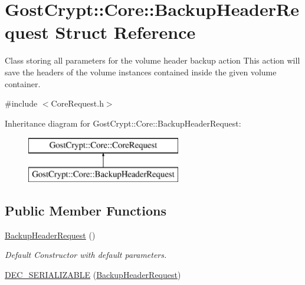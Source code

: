 \hypertarget{struct_gost_crypt_1_1_core_1_1_backup_header_request}{}\section{Gost\+Crypt\+:\+:Core\+:\+:Backup\+Header\+Request Struct Reference}
\label{struct_gost_crypt_1_1_core_1_1_backup_header_request}


Class storing all parameters for the volume header backup action This action will save the headers of the volume instances contained inside the given volume container.  




{\ttfamily \#include $<$Core\+Request.\+h$>$}

Inheritance diagram for Gost\+Crypt\+:\+:Core\+:\+:Backup\+Header\+Request\+:\begin{figure}[H]
\begin{center}
\leavevmode
\includegraphics[height=2.000000cm]{struct_gost_crypt_1_1_core_1_1_backup_header_request}
\end{center}
\end{figure}
\subsection*{Public Member Functions}
\begin{DoxyCompactItemize}
\item 
\hyperlink{struct_gost_crypt_1_1_core_1_1_backup_header_request_a5af656ceab0d38e0a47d46d0e02de1f7}{Backup\+Header\+Request} ()
\begin{DoxyCompactList}\small\item\em Default Constructor with default parameters. \end{DoxyCompactList}\item 
\hyperlink{struct_gost_crypt_1_1_core_1_1_backup_header_request_ad652b564ac9997d43ab65b69ddb66124}{D\+E\+C\+\_\+\+S\+E\+R\+I\+A\+L\+I\+Z\+A\+B\+LE} (\hyperlink{struct_gost_crypt_1_1_core_1_1_backup_header_request}{Backup\+Header\+Request})
\end{DoxyCompactItemize}
